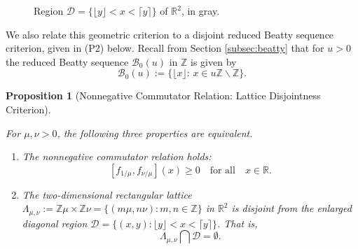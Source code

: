 \documentclass[11pt, letterpaper, reqno]{amsart}
\newtheorem{prop}[thm]{Proposition}
\theoremstyle{definition}
\numberwithin{equation}{section}
\newcommand{\RR}{\ensuremath{\mathbb{R}}}
\newcommand{\ZZ}{\ensuremath{\mathbb{Z}}}
\newcommand{\sB}{\mathcal{B}}
\newcommand{\floor}[1]{\lfloor{#1}\rfloor}
\newcommand{\ceil}[1]{\lceil{#1}\rceil}
\newcommand{\um}{{\mu}}
\newcommand{\vm}{{\nu}}
\newcommand{\cD}{\mathcal{D}}
\begin{document}
{%
\begin{figure}[h]
\begin{center}
\end{center}
\caption{Region $\cD= \{\floor{y}<x<\ceil{y}\}$ of $\RR^2$, in gray.}
\label{fig:diagonal-pos}
\end{figure}

We also relate this geometric criterion to a disjoint reduced Beatty sequence criterion,
given in (P2) below. 
Recall from Section \ref{subsec:beatty} that for $u >0$ the reduced  Beatty sequence 
$\sB_0(u)$  in $\ZZ$ is given by 
$$
\sB_0(u) := \{ \floor x : \,  x \in u\ZZ \smallsetminus \ZZ\} .
$$

\begin{prop}[Nonnegative Commutator Relation: Lattice Disjointness Criterion]
\label{lem:diagonal-pos}

For $\um,\vm> 0$, the following three properties are equivalent.
\begin{enumerate}
\item[(P1)] 
\label{lattice-p1}
The nonnegative commutator relation holds:
$$
[f_{1/\um}, f_{\vm/\um}](x) \geq 0\quad \mbox{for all} \quad x \in \RR.
$$ 

\item[(P2)] \label{lattice-p2}
The two-dimensional rectangular lattice
$\Lambda_{\um,\vm} := \ZZ \um \times \ZZ \vm = \{ (m\um, n\vm) : m,n\in\ZZ\} $
in $\RR^2$ is disjoint from the enlarged diagonal region $\mathcal{D}= \{(x, y): \floor{y} < x < \ceil{y}\}$.
 That is,  
\begin{equation}\label{eq:diag}
 \Lambda_{\um,\vm} \bigcap \mathcal{D} = \emptyset.
\end{equation}
 

\end{enumerate}
\end{prop}}
\end{document}
